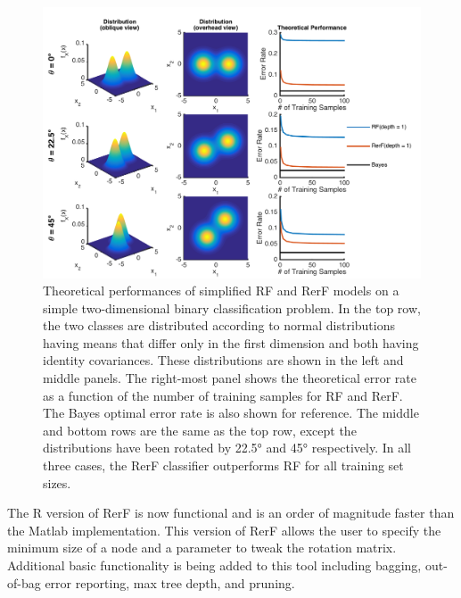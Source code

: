 \documentclass[simplex.tex]{subfiles}
\begin{document}
\begin{figure}[h!]
\begin{cframed}
\centering
\includegraphics[height=0.4\textheight]{../../figs/RerF_2017_03.png}
\caption{
Theoretical performances of simplified RF and RerF models on a simple two-dimensional binary classification problem. In the top row, the two classes are distributed according to normal distributions having means that differ only in the first dimension and both having identity covariances. These distributions are shown in the left and middle panels. The right-most panel shows the theoretical error  rate as a function of the number of training samples for RF and RerF. The Bayes optimal error rate is also shown for reference. The middle and bottom rows are the same as the top row, except the distributions have been rotated by 22.5° and 45° respectively. In all three cases, the RerF classifier outperforms RF for all training set sizes.
}
\label{fig:RerF}
\end{cframed}
\end{figure}

The R version of RerF is now functional and is an order of magnitude faster than the Matlab implementation.  This version of RerF allows the user to specify the minimum size of a node and a parameter to tweak the rotation matrix.  Additional basic functionality is being added to this tool including bagging, out-of-bag error reporting, max tree depth, and pruning.   

\clearpage
\end{document}
